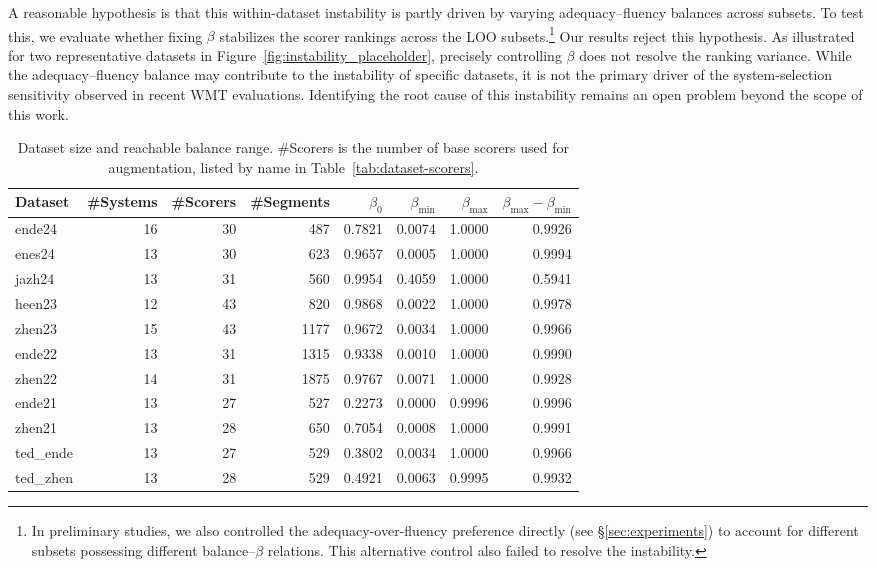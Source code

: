 \documentclass[11pt]{article}
\begin{document}
A reasonable hypothesis is that this within-dataset instability is partly driven by varying adequacy--fluency balances across subsets. To test this, we evaluate whether fixing $\beta$ stabilizes the scorer rankings across the LOO subsets.\footnote{In preliminary studies, we also controlled the adequacy-over-fluency preference directly (see \S\ref{sec:experiments}) to account for different subsets possessing different balance--$\beta$ relations. This alternative control also failed to resolve the instability.}
Our results reject this hypothesis. As illustrated for two representative datasets in Figure~\ref{fig:instability_placeholder}, precisely controlling $\beta$ does not resolve the ranking variance. While the adequacy--fluency balance may contribute to the instability of specific datasets, it is not the primary driver of the system-selection sensitivity observed in recent WMT evaluations. Identifying the root cause of this instability remains an open problem beyond the scope of this work.



\begin{table}[t]
\centering
\begin{tabular}{lrrrrrrr}
\toprule
Dataset & \#Systems & \#Scorers & \#Segments & $\beta_0$ & $\beta_{\min}$ & $\beta_{\max}$ & $\beta_{\max}-\beta_{\min}$ \\
\midrule
ende24 & 16 & 30 & 487 & 0.7821 & 0.0074 & 1.0000 & 0.9926 \\
enes24 & 13 & 30 & 623 & 0.9657 & 0.0005 & 1.0000 & 0.9994 \\
jazh24 & 13 & 31 & 560 & 0.9954 & 0.4059 & 1.0000 & 0.5941 \\
heen23 & 12 & 43 & 820 & 0.9868 & 0.0022 & 1.0000 & 0.9978 \\
zhen23 & 15 & 43 & 1177 & 0.9672 & 0.0034 & 1.0000 & 0.9966 \\
ende22 & 13 & 31 & 1315 & 0.9338 & 0.0010 & 1.0000 & 0.9990 \\
zhen22 & 14 & 31 & 1875 & 0.9767 & 0.0071 & 1.0000 & 0.9928 \\
ende21 & 13 & 27 & 527 & 0.2273 & 0.0000 & 0.9996 & 0.9996 \\
zhen21 & 13 & 28 & 650 & 0.7054 & 0.0008 & 1.0000 & 0.9991 \\
ted\_ende & 13 & 27 & 529 & 0.3802 & 0.0034 & 1.0000 & 0.9966 \\
ted\_zhen & 13 & 28 & 529 & 0.4921 & 0.0063 & 0.9995 & 0.9932 \\
\bottomrule
\end{tabular}%
\caption{Dataset size and reachable balance range. \#Scorers is the number of base scorers used for augmentation, listed by name in Table~\ref{tab:dataset-scorers}.}
\label{tab:dataset-core}
\end{table}
\end{document}
